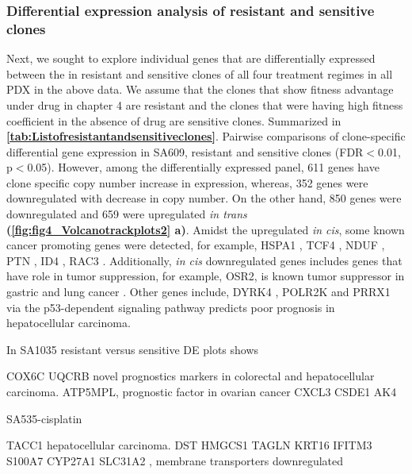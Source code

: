 \subsubsection{Differential expression analysis of resistant and sensitive clones}
 Next, we sought to explore individual genes that are differentially expressed  between the in resistant and sensitive clones of all four treatment regimes in all PDX in the above data. We assume that the clones that show fitness advantage under drug in chapter 4 are resistant and the clones that were having high fitness coefficient in the absence of drug are sensitive clones. Summarized in  \textbf{\autoref{tab:Listofresistantandsensitiveclones}}.
 Pairwise comparisons of clone-specific differential gene expression in SA609, resistant and sensitive clones (FDR$<$0.01, p$<$0.05). However, among the differentially expressed panel, 611 genes have clone specific copy number increase in expression, whereas, 352 genes were downregulated with decrease in copy number. On the other hand, 850 genes were downregulated and 659 were upregulated \textit{in trans} \textbf{(\autoref{fig:fig4_Volcanotrackplots2} a)}. Amidst the upregulated \textit{in cis}, some known cancer promoting genes were detected, for example, HSPA1 \cite{zoppino2018comprehensive}, TCF4 \cite{ravindranath2011wnt}, NDUF \cite{li2015down}, PTN \cite{huang2018chemotherapy}, ID4 \cite{donzelli2018expression}, RAC3 \cite{donnelly2017rac3}. Additionally, \textit{in cis} downregulated genes includes genes that have role in tumor suppression, for example, OSR2, is known tumor suppressor in gastric and lung cancer \cite{otani2014odd,wang2018odd}. Other genes include, DYRK4 \cite{yoshida2019multiple}, POLR2K \cite{lopez2020prediction} and PRRX1 \cite{fan2017downregulation} via the p53-dependent signaling pathway predicts poor prognosis in hepatocellular carcinoma.
 
In SA1035 resistant versus sensitive DE plots shows  


 COX6C \cite{yang2018overexpression,chang2017estrogen}
 UQCRB \cite{kim2017mitochondrial,park2017mitochondrial} novel prognostics markers in colorectal and hepatocellular carcinoma.
 ATP5MPL, prognostic factor in ovarian cancer
 CXCL3 \cite{gui2016overexpression, karin2020cxcr3}
CSDE1 \cite{martinez2019unr}
AK4 \cite{jan2019co}


SA535-cisplatin

TACC1 \cite{shakya2018high} hepatocellular carcinoma.
DST  \cite{salerno2016human}
HMGCS1 \cite{walsh2020mevalonate}
TAGLN \cite{wu2014transgelin, elsafadi2020transgelin}
KRT16 \cite{huang2019novel}
IFITM3 \cite{liu2019ifitm3}
S100A7 \cite{zhang2019clinical, mayama2018olfm}
CYP27A1  \cite{liang2019cyp27a1, wu201327}
SLC31A2 \cite{bai2017structural}, membrane transporters downregulated

